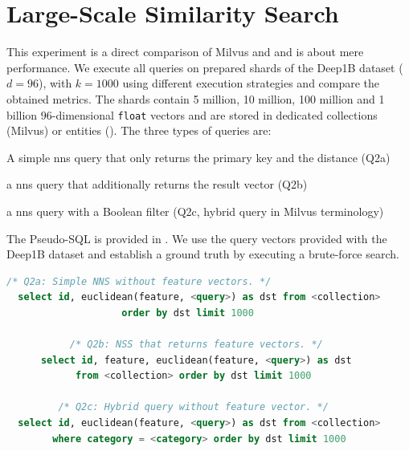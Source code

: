 \section{Large-Scale Similarity Search}
This experiment is a direct comparison of Milvus and \cottontail{} and is about mere performance. We execute all queries on prepared shards of the Deep1B \cite{Babenko:2016Efficient} dataset ($d=96$), with $k=1000$ using different execution strategies and compare the obtained metrics. The shards contain 5 million, 10 million, 100 million and 1 billion $96$-dimensional \texttt{float} vectors and are stored in dedicated collections (Milvus) or entities (\cottontail). The three types of queries are:
\begin{enumerate*}[label=(\roman*),itemjoin={{, }}, itemjoin*={{, and, }}, after={{.}}]
    \item A simple \acrshort{nns} query that only returns the primary key and the distance (Q2a)
    \item a \acrshort{nns} query that additionally returns the result vector (Q2b)
    \item a \acrshort{nns} query with a Boolean filter (Q2c, hybrid query in Milvus terminology)
\end{enumerate*} 
The Pseudo-SQL is provided in . We use the query vectors provided with the Deep1B dataset and establish a ground truth by executing a brute-force search.

\begin{lstlisting}[language=SQL, caption={Pseudo-SQL of the queries executed for this experiment.}, label=listing:big_nns_query, numbers=none]
           /* Q2a: Simple NNS without feature vectors. */
  select id, euclidean(feature, <query>) as dst from <collection> 
                    order by dst limit 1000
    
           /* Q2b: NSS that returns feature vectors. */
      select id, feature, euclidean(feature, <query>) as dst 
            from <collection> order by dst limit 1000

         /* Q2c: Hybrid query without feature vector. */
  select id, euclidean(feature, <query>) as dst from <collection> 
        where category = <category> order by dst limit 1000
\end{lstlisting}


